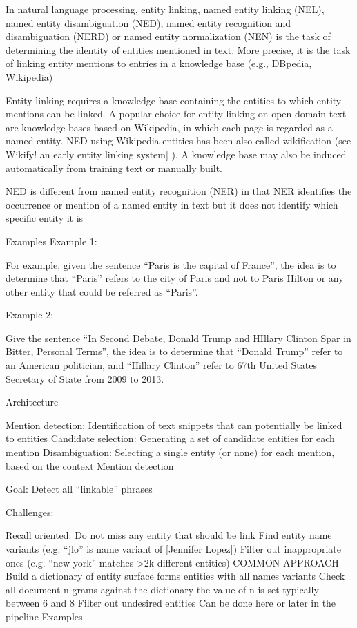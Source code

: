 In natural language processing, entity linking, named entity linking (NEL), named entity disambiguation (NED), named entity recognition and disambiguation (NERD) or named entity normalization (NEN) is the task of determining the identity of entities mentioned in text. More precise, it is the task of linking entity mentions to entries in a knowledge base (e.g., DBpedia, Wikipedia)

Entity linking requires a knowledge base containing the entities to which entity mentions can be linked. A popular choice for entity linking on open domain text are knowledge-bases based on Wikipedia, in which each page is regarded as a named entity. NED using Wikipedia entities has been also called wikification (see Wikify! an early entity linking system] ). A knowledge base may also be induced automatically from training text or manually built.

NED is different from named entity recognition (NER) in that NER identifies the occurrence or mention of a named entity in text but it does not identify which specific entity it is

Examples
Example 1:

For example, given the sentence “Paris is the capital of France”, the idea is to determine that “Paris” refers to the city of Paris and not to Paris Hilton or any other entity that could be referred as “Paris”.



Example 2:

Give the sentence “In Second Debate, Donald Trump and HIllary Clinton Spar in Bitter, Personal Terms”, the idea is to determine that “Donald Trump” refer to an American politician, and “Hillary Clinton” refer to 67th United States Secretary of State from 2009 to 2013.



Architecture


Mention detection: Identification of text snippets that can potentially be linked to entities
Candidate selection: Generating a set of candidate entities for each mention
Disambiguation: Selecting a single entity (or none) for each mention, based on the context
Mention detection


Goal: Detect all “linkable” phrases

Challenges:

Recall oriented: Do not miss any entity that should be link
Find entity name variants (e.g. “jlo” is name variant of [Jennifer Lopez])
Filter out inappropriate ones (e.g. “new york” matches >2k different entities)
COMMON APPROACH
Build a dictionary of entity surface forms
entities with all names variants
Check all document n-grams against the dictionary
the value of n is set typically between 6 and 8
Filter out undesired entities
Can be done here or later in the pipeline
Examples



